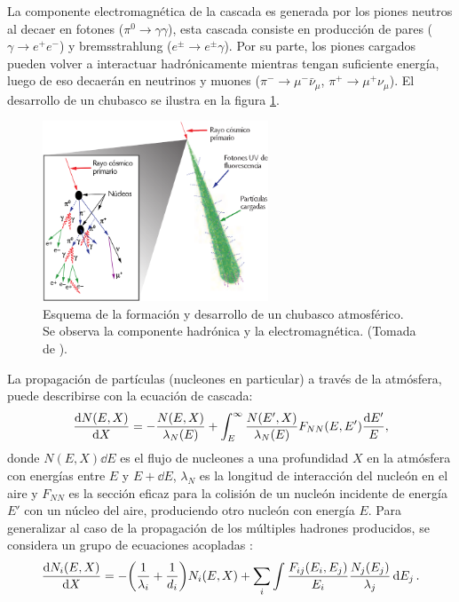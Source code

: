	La componente electromagnética de la cascada es generada por los piones neutros al decaer en fotones ($\pi^0 \rightarrow \gamma \gamma$), esta cascada consiste en producción de pares ($\gamma\rightarrow e^+ e^-$) y bremsstrahlung ($e^{\pm} \rightarrow e^{\pm}\gamma$). Por su parte, los piones cargados pueden volver a interactuar hadrónicamente mientras tengan suficiente energía, luego de eso decaerán en neutrinos y muones ($\pi^{-} \rightarrow \mu^- \bar{\nu}_{\mu}$, $\pi^{+} \rightarrow \mu^+ \nu_{\mu} $). El desarrollo de un chubasco se ilustra en la figura \ref{fig:airshower}.\\
				
	\begin{figure}[h]
	\centering
	\includegraphics[width=0.6\textwidth]{Figuras/air_shower} 
	\caption{Esquema de la formación y desarrollo de un chubasco atmosférico. Se observa la componente hadrónica y la electromagnética. (Tomada de \cite{Poderosas}).}
	\label{fig:airshower}
	\end{figure}	
	
	La propagación de partículas (nucleones en particular) a través de la atmósfera, puede describirse con la ecuación de cascada:
	\begin{align}
	\dv{N(E,X)}{X} = -\frac{N(E,X)}{\lambda_N(E)} + \int_E^{\infty}\frac{N(E',X)}{\lambda_N(E)} F_{NN}(E,E') \frac{\dd E'}{E},
	\end{align}
	donde $N(E,X) \dd E$ es el flujo de nucleones a una profundidad $X$ en la atmósfera con energías entre $E$ y $E+\dd E$, $\lambda_N$ es la longitud de interacción del nucleón en el aire y $F_{NN}$ es la sección eficaz para la colisión de un nucleón incidente de energía $E'$ con un núcleo del aire, produciendo otro nucleón con energía $E$. Para generalizar al caso de la propagación de los múltiples hadrones producidos, se considera un grupo de ecuaciones acopladas \cite{Gaisser1990}:
	\begin{align}
	\dv{N_i(E,X)}{X} = -\qty(\frac{1}{\lambda_i}+\frac{1}{d_i}) N_i(E,X) + \sum_i \int \frac{F_{ij}(E_i,E_j)}{E_i} \frac{N_j(E_j)}{\lambda_j} \dd{E_j}.
	\end{align}

